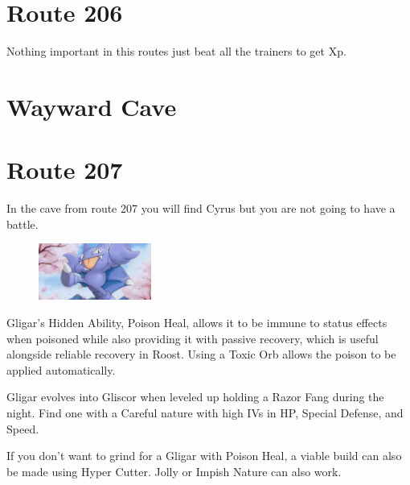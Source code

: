 \documentclass[11pt]{article}
\begin{document}
\section{Route 206}\label{sec:Route_206}

Nothing important in this routes just beat all the trainers to get Xp.



\section{Wayward Cave}
\label{sec:Wayward_Cave}


\section{Route 207}\label{sec:Route_207}

In the cave from route 207 you will find Cyrus but you are not going to have a battle.




\begin{mdframed}[style=MyFrame,nobreak=true,frametitle={Pokemon Spotlight: Gligar}]

\begin{figure}
\includegraphics[width=0.33\textwidth]{walkthrough/Sinnoh/spotlight-gligar}
\label{fig:spotlight-gligar}
\end{figure}

Gligar's Hidden Ability, Poison Heal, allows it to be immune to status effects
when poisoned while also providing it with passive recovery, which is useful
alongside reliable recovery in Roost.
Using a Toxic Orb allows the poison to be applied automatically.

Gligar evolves into Gliscor when leveled up holding a Razor Fang during the night.
Find one with a Careful nature with high IVs in HP, Special Defense, and Speed.

If you don't want to grind for a Gligar with Poison Heal, a viable build can
also be made using Hyper Cutter.
Jolly or Impish Nature can also work.

\end{mdframed}
\end{document}
